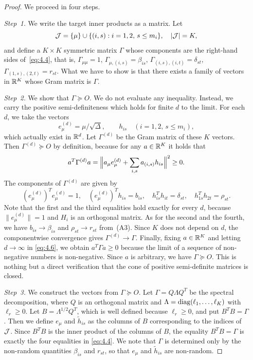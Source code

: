 \begin{proof}
We proceed in four steps.

\textit{Step~1.} We write the target inner products as a matrix. Let
\[
\mathcal{J}=\{\mu\}\cup\{(i,s):i=1,2,\,s\le m_i\},
\quad|\mathcal{J}|=K,
\]
and define a $K\times K$ symmetric matrix $\Gamma$ whose components are the
right-hand sides of~\eqref{eq:4.4}, that is,
$\Gamma_{\mu\mu}=1$, $\Gamma_{\mu,(i,s)}=\beta_{is}$,
$\Gamma_{(i,s),(i,t)}=\delta_{st}$, $\Gamma_{(1,s),(2,t)}=r_{st}$.
What we have to show is that there exists a family of vectors in $\mathbb{R}^K$ whose Gram
matrix is $\Gamma$.

\textit{Step~2.} We show that $\Gamma\succeq O$. We do not evaluate any inequality.
Instead, we carry the positive semi-definiteness which holds for finite $d$ to the
limit. For each $d$, we take the vectors
\[
e_\mu^{(d)}=\mu/\sqrt{\Delta},\qquad h_{is}\quad(i=1,2,\,s\le m_i),
\]
which actually exist in $\mathbb{R}^d$. Let $\Gamma^{(d)}$ be the Gram matrix of these $K$
vectors. Then $\Gamma^{(d)}\succeq O$ by definition, because for any
$a\in\mathbb{R}^K$ it holds that
\begin{equation}
a^T\Gamma^{(d)}a
=\Bigl\|a_\mu e_\mu^{(d)}+\sum_{i,s}a_{(i,s)}h_{is}\Bigr\|^2\ge 0.
\label{eq:4.6}
\end{equation}
The components of $\Gamma^{(d)}$ are given by
\[
(e_\mu^{(d)})^Te_\mu^{(d)}=1,\quad
(e_\mu^{(d)})^Th_{is}=b_{is},\quad
h_{is}^Th_{it}=\delta_{st},\quad
h_{1s}^Th_{2t}=\rho_{st}.
\]
Note that the first and the third equalities hold exactly for every $d$, because
$\|e_\mu^{(d)}\|=1$ and $H_i$ is an orthogonal matrix. As for the second and the
fourth, we have $b_{is}\to\beta_{is}$ and $\rho_{st}\to r_{st}$ from~(A3). Since
$K$ does not depend on $d$, the componentwise convergence gives
$\Gamma^{(d)}\to\Gamma$. Finally, fixing $a\in\mathbb{R}^K$ and letting $d\to\infty$ in
\eqref{eq:4.6}, we obtain $a^T\Gamma a\ge 0$ because the limit of a sequence of
non-negative numbers is non-negative. Since $a$ is arbitrary, we have
$\Gamma\succeq O$. This is nothing but a direct verification that the cone of
positive semi-definite matrices is closed.

\textit{Step~3.} We construct the vectors from $\Gamma\succeq O$. Let
$\Gamma=Q\Lambda Q^T$ be the spectral decomposition, where $Q$ is an orthogonal
matrix and $\Lambda=\operatorname{diag}(\ell_1,\dots,\ell_K)$ with $\ell_r\ge 0$. Let
$B=\Lambda^{1/2}Q^T$, which is well defined because $\ell_r\ge 0$, and put
$B^TB=\Gamma$. Then we define $e_\mu$ and $\tilde h_{is}$ as the columns of $B$
corresponding to the indices of $\mathcal{J}$. Since $B^TB$ is the inner product of the
columns of $B$, the equality $B^TB=\Gamma$ is exactly the four equalities in
\eqref{eq:4.4}. We note that $\Gamma$ is determined only by the non-random
quantities $\beta_{is}$ and $r_{st}$, so that $e_\mu$ and $\tilde h_{is}$ are
non-random.


\end{proof}
